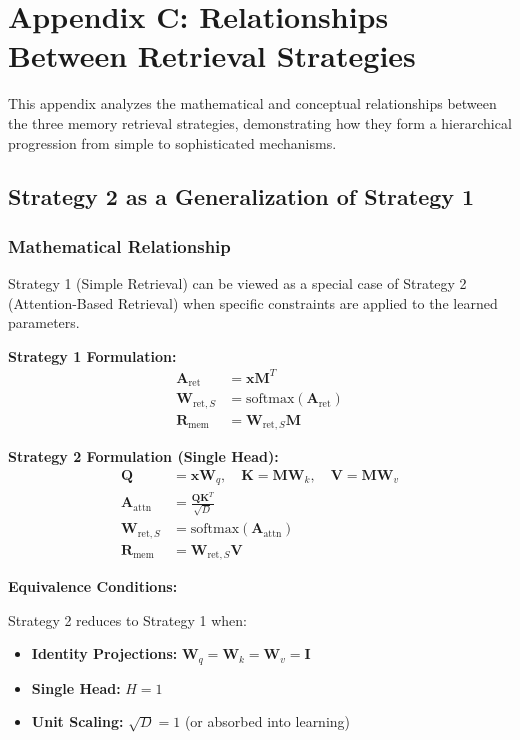 \documentclass{article}
\begin{document}
\section{Appendix C: Relationships Between Retrieval Strategies}

This appendix analyzes the mathematical and conceptual relationships between the three memory retrieval strategies, demonstrating how they form a hierarchical progression from simple to sophisticated mechanisms.

\subsection{Strategy 2 as a Generalization of Strategy 1}

\subsubsection{Mathematical Relationship}

Strategy 1 (Simple Retrieval) can be viewed as a special case of Strategy 2 (Attention-Based Retrieval) when specific constraints are applied to the learned parameters.

\textbf{Strategy 1 Formulation:}
\begin{align}
\mathbf{A}_{\text{ret}} &= \mathbf{x} \mathbf{M}^T \\
\mathbf{W}_{\text{ret},S} &= \text{softmax}(\mathbf{A}_{\text{ret}}) \\
\mathbf{R}_{\text{mem}} &= \mathbf{W}_{\text{ret},S} \mathbf{M}
\end{align}

\textbf{Strategy 2 Formulation (Single Head):}
\begin{align}
\mathbf{Q} &= \mathbf{x} \mathbf{W}_q, \quad \mathbf{K} = \mathbf{M} \mathbf{W}_k, \quad \mathbf{V} = \mathbf{M} \mathbf{W}_v \\
\mathbf{A}_{\text{attn}} &= \frac{\mathbf{Q} \mathbf{K}^T}{\sqrt{D}} \\
\mathbf{W}_{\text{ret},S} &= \text{softmax}(\mathbf{A}_{\text{attn}}) \\
\mathbf{R}_{\text{mem}} &= \mathbf{W}_{\text{ret},S} \mathbf{V}
\end{align}

\textbf{Equivalence Conditions:}

Strategy 2 reduces to Strategy 1 when:
\begin{itemize}
\item \textbf{Identity Projections:} $\mathbf{W}_q = \mathbf{W}_k = \mathbf{W}_v = \mathbf{I}$
\item \textbf{Single Head:} $H = 1$
\item \textbf{Unit Scaling:} $\sqrt{D} = 1$ (or absorbed into learning)
\end{itemize}
\end{document}
